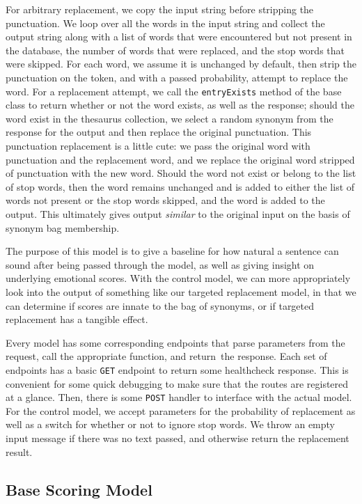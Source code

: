 \documentclass[11pt, twoside, reqno]{book}
\begin{document}
For arbitrary replacement, we copy the input string before stripping the punctuation. We loop over all the words in the input string and collect the output string along with a list of words that were encountered but not present in the database, the number of words that were replaced, and the stop words that were skipped. For each word, we assume it is unchanged by default, then strip the punctuation on the token, and with a passed probability, attempt to replace the word. For a replacement attempt, we call the \texttt{entryExists} method of the base class to return whether or not the word exists, as well as the response; should the word exist in the thesaurus collection, we select a random synonym from the response for the output and then replace the original punctuation. This punctuation replacement is a little cute: we pass the original word with punctuation and the replacement word, and we replace the original word stripped of punctuation with the new word. Should the word not exist or belong to the list of stop words, then the word remains unchanged and is added to either the list of words not present or the stop words skipped, and the word is added to the output. This ultimately gives output \textit{similar} to the original input on the basis of synonym bag membership.

The purpose of this model is to give a baseline for how natural a sentence can sound after being passed through the model, as well as giving insight on underlying emotional scores. With the control model, we can more appropriately look into the output of something like our targeted replacement model, in that we can determine if scores are innate to the bag of synonyms, or if targeted replacement has a tangible effect.

Every model has some corresponding endpoints that parse parameters from the request, call the appropriate function, and return the response. Each set of endpoints has a basic \texttt{GET} endpoint to return some healthcheck response. This is convenient for some quick debugging to make sure that the routes are registered at a glance. Then, there is some \texttt{POST} handler to interface with the actual model. For the control model, we accept parameters for the probability of replacement as well as a switch for whether or not to ignore stop words. We throw an empty input message if there was no text passed, and otherwise return the replacement result.

\subsection{Base Scoring Model}
\end{document}
